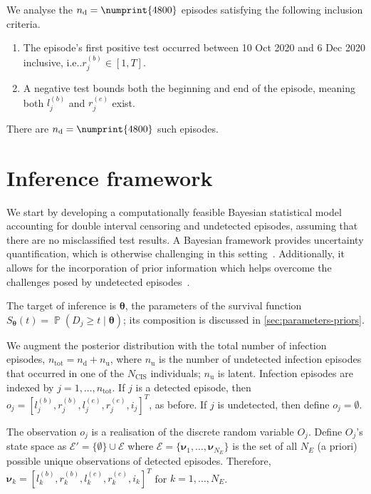 \documentclass[12pt]{article}
\makeatletter
\DeclareMathOperator{\prob}{\mathbb{P}}
\newcommand\set{\mathcal}
\renewcommand{\vec}[1]{\bm{#1}}
\newcommand{\ntot}{n_\text{tot}}
\newcommand{\ndet}{n_\text{d}}
\newcommand{\nnodet}{n_\text{u}}
\newcommand{\Ncis}{N_\text{CIS}}
\DeclareRobustCommand\onedot{\futurelet\@let@token\@onedot}
\def\@onedot{\ifx\@let@token.\else.\null\fi\xspace}
\def\ie{i.e\onedot} \def\Ie{{I.e}\onedot}
\makeatother
\begin{document}
We analyse the $\ndet = \numprint{4800}$ episodes satisfying the following inclusion criteria.
\begin{enumerate}
  \item The episode's first positive test occurred between 10 Oct 2020 and 6 Dec 2020 inclusive, \ie $r_j^{(b)} \in [1, T]$.
  \item A negative test bounds both the beginning and end of the episode, meaning both $l_j^{(b)}$ and $r_j^{(e)}$ exist.
\end{enumerate}
There are $\ndet = \numprint{4800}$ such episodes.



\section{Inference framework} \label{sec:inference}

We start by developing a computationally feasible Bayesian statistical model accounting for double interval censoring and undetected episodes, assuming that there are no misclassified test results.
A Bayesian framework provides uncertainty quantification, which is otherwise challenging in this setting~\citep{sunStatistical,dengNonparametric}.
Additionally, it allows for the incorporation of prior information which helps overcome the challenges posed by undetected episodes~\citep{caoBias}.


The target of inference is $\vec{\theta}$, the parameters of the survival function $S_{\vec{\theta}}(t) = \prob(D_j \geq t \mid \vec\theta)$; its composition is discussed in \cref{sec:parameters-priors}.

We augment the posterior distribution with the total number of infection episodes, $\ntot = \ndet + \nnodet$, where $\nnodet$ is the number of undetected infection episodes that occurred in one of the $\Ncis$ individuals; $\nnodet$ is latent.
Infection episodes are indexed by $j = 1, \dots, \ntot$.
If $j$ is a detected episode, then $o_j = [l_j^{(b)}, r_j^{(b)}, l_j^{(e)}, r_j^{(e)}, i_j]^T$, as before.
If $j$ is undetected, then define $o_j = \emptyset$.

The observation $o_j$ is a realisation of the discrete random variable $O_j$.
Define $O_j$'s state space as $\set{E}' = \{ \emptyset \} \cup \set{E}$ where $\set{E} = \{ \vec{\nu}_1, \dots, \vec{\nu}_{N_E} \}$ is the set of all $N_E$ (a priori) possible unique observations of detected episodes.
Therefore, $\vec{\nu}_k = [l^{(b)}_k, r^{(b)}_k, l^{(e)}_k, r^{(e)}_k, i_k]^T$ for $k = 1, \dots, N_E$.
\end{document}
